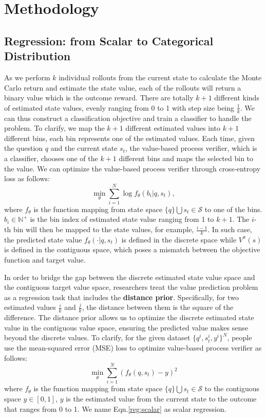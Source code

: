 \section{Methodology}

\subsection{Regression: from Scalar to Categorical Distribution}\label{sec:regression}
As we perform $k$ individual rollouts from the current state to calculate the Monte Carlo return and estimate the state value, each of the rollouts will return a binary value which is the outcome reward. There are totally $k+1$ different kinds of estimated state values, evenly ranging from 0 to 1 with step size being $\frac{1}{k}$. We can thus construct a classification objective and train a classifier to handle the problem. To clarify, we map the $k+1$ different estimated values into $k+1$ different bins, each bin represents one of the estimated values. Each time, given the question $q$ and the current state $s_t$, the value-based process verifier, which is a classifier, chooses one of the $k+1$ different bins and maps the selected bin to the value. We can optimize the value-based process verifier through cross-entropy loss as follows:
\begin{equation}
    \min_\theta\sum_{i=1}^N\log f_\theta(b_i|q,s_t),
\end{equation}
where $f_\theta$ is the function mapping from state space $\{q\}\bigcup s_t\in\mathcal{S}$ to one of the bins. $b_i\in\mathbb{N}^+$ is the bin index of estimated state value ranging from 1 to $k+1$. The $i$-th bin will then be mapped to the state values, for example, $\frac{i-1}{k}$. In such case, the predicted state value $f_\theta(\cdot|q,s_t)$ is defined in the discrete space while $V^\pi(s)$ is defined in the contiguous space, which poses a mismatch between the objective function and target value. 

In order to bridge the gap between the discrete estimated state value space and the contiguous target value space, researchers treat the value prediction problem as a regression task that includes the \textbf{distance prior}. Specifically, for two estimated values $\frac{i}{k}$ and $\frac{j}{k}$, the distance between them is the square of the difference. The distance prior allows us to optimize the discrete estimated state value in the contiguous value space, ensuring the predicted value makes sense beyond the discrete values. To clarify, for the given dataset $\{q^i, s_t^i,y^i\}^N$, people use the mean-squared error (MSE) loss to optimize value-based process verifier as follows:
\begin{equation}\label{reg:scalar}
    \min_\theta\sum_{i=1}^N(f_\theta(q, s_t)-y)^2
\end{equation}
where $f_\theta$ is the function mapping from state space $\{q\}\bigcup s_t\in\mathcal{S}$ to the contiguous space $y\in[0,1]$, $y$ is the estimated value from the current state to the outcome that ranges from 0 to 1. We name Eqn.\ref{reg:scalar} as scalar regression.

